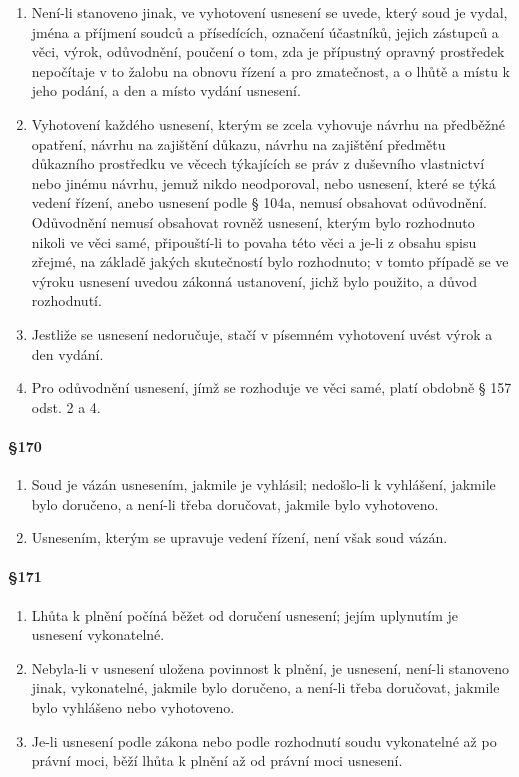 \begin{enumerate}[label={(\arabic*)}]
  \item Není-li stanoveno jinak, ve vyhotovení usnesení se uvede, který soud je vydal, jména a příjmení soudců a přísedících, označení účastníků, jejich zástupců a věci, výrok, odůvodnění, poučení o tom, zda je přípustný opravný prostředek nepočítaje v to žalobu na obnovu řízení a pro zmatečnost, a o lhůtě a místu k jeho podání, a den a místo vydání usnesení.
  \item Vyhotovení každého usnesení, kterým se zcela vyhovuje návrhu na předběžné opatření, návrhu na zajištění důkazu, návrhu na zajištění předmětu důkazního prostředku ve věcech týkajících se práv z duševního vlastnictví nebo jinému návrhu, jemuž nikdo neodporoval, nebo usnesení, které se týká vedení řízení, anebo usnesení podle § 104a, nemusí obsahovat odůvodnění. Odůvodnění nemusí obsahovat rovněž usnesení, kterým bylo rozhodnuto nikoli ve věci samé, připouští-li to povaha této věci a je-li z obsahu spisu zřejmé, na základě jakých skutečností bylo rozhodnuto; v tomto případě se ve výroku usnesení uvedou zákonná ustanovení, jichž bylo použito, a důvod rozhodnutí.
  \item Jestliže se usnesení nedoručuje, stačí v písemném vyhotovení uvést výrok a den vydání.
  \item Pro odůvodnění usnesení, jímž se rozhoduje ve věci samé, platí obdobně § 157 odst. 2 a 4.
\end{enumerate}

\paragraph{\S 170}

\begin{enumerate}[label={(\arabic*)}]
  \item Soud je vázán usnesením, jakmile je vyhlásil; nedošlo-li k vyhlášení, jakmile bylo doručeno, a není-li třeba doručovat, jakmile bylo vyhotoveno.
  \item Usnesením, kterým se upravuje vedení řízení, není však soud vázán.
\end{enumerate}

\paragraph{\S 171}

\begin{enumerate}[label={(\arabic*)}]
  \item Lhůta k plnění počíná běžet od doručení usnesení; jejím uplynutím je usnesení vykonatelné.
  \item Nebyla-li v usnesení uložena povinnost k plnění, je usnesení, není-li stanoveno jinak, vykonatelné, jakmile bylo doručeno, a není-li třeba doručovat, jakmile bylo vyhlášeno nebo vyhotoveno.
  \item Je-li usnesení podle zákona nebo podle rozhodnutí soudu vykonatelné až po právní moci, běží lhůta k plnění až od právní moci usnesení.
\end{enumerate}

